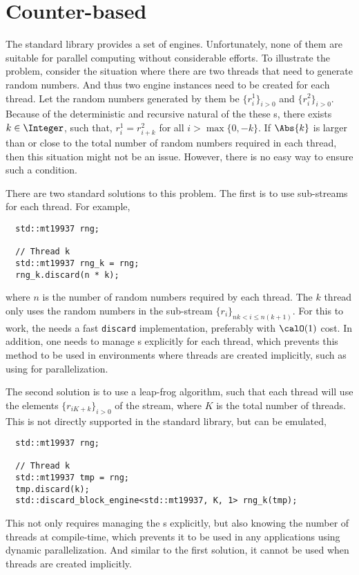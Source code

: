 \section{Counter-based \protect\rng}
\label{sec:Counter-based RNG}

The standard library provides a set of \rng engines. Unfortunately, none of
them are suitable for parallel computing without considerable efforts. To
illustrate the problem, consider the situation where there are two threads that
need to generate random numbers. And thus two \rng engine instances need to be
created for each thread. Let the random numbers generated by them be
$\{r_i^1\}_{i>0}$ and $\{r_i^2\}_{i>0}$. Because of the deterministic and
recursive natural of the these \rng{}s, there exists $k\in\Integer$, such that,
$r_i^1 = r_{i + k}^2$ for all $i > \max\{0, -k\}$. If $\Abs{k}$ is larger than
or close to the total number of random numbers required in each thread, then
this situation might not be an issue. However, there is no easy way to ensure
such a condition.

There are two standard solutions to this problem. The first is to use
sub-streams for each thread. For example,
\begin{Verbatim}
  std::mt19937 rng;

  // Thread k
  std::mt19937 rng_k = rng;
  rng_k.discard(n * k);
\end{Verbatim}
where $n$ is the number of random numbers required by each thread. The $k$\ith
thread only uses the random numbers in the sub-stream $\{r_i\}_{nk < i \le
  n(k+1)}$. For this to work, the \rng needs a fast \verb|discard|
implementation, preferably with $\calO(1)$ cost. In addition, one needs to
manage \rng{}s explicitly for each thread, which prevents this method to be
used in environments where threads are created implicitly, such as using \tbb
for parallelization.

The second solution is to use a leap-frog algorithm, such that each thread will
use the elements $\{r_{iK + k}\}_{i>0}$ of the stream, where $K$ is the total
number of threads. This is not directly supported in the standard library, but
can be emulated,
\begin{Verbatim}
  std::mt19937 rng;

  // Thread k
  std::mt19937 tmp = rng;
  tmp.discard(k);
  std::discard_block_engine<std::mt19937, K, 1> rng_k(tmp);
\end{Verbatim}
This not only requires managing the \rng{}s explicitly, but also knowing the
number of threads at compile-time, which prevents it to be used in any
applications using dynamic parallelization. And similar to the first solution,
it cannot be used when threads are created implicitly.

